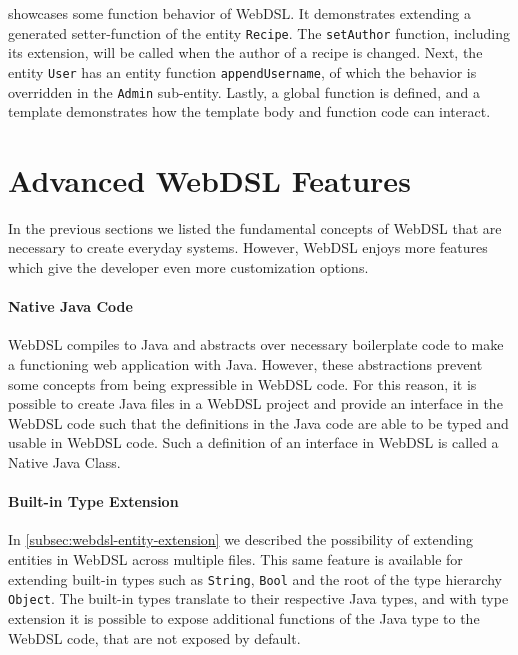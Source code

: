      showcases some function behavior of WebDSL. It demonstrates extending a generated setter-function of the entity \texttt{Recipe}. The \texttt{setAuthor} function, including its extension, will be called when the author of a recipe is changed. Next, the entity \texttt{User} has an entity function \texttt{appendUsername}, of which the behavior is overridden in the \texttt{Admin} sub-entity. Lastly, a global function is defined, and a template demonstrates how the template body and function code can interact.
  
  \section{\label{sec:advanced-webdsl-features}Advanced WebDSL Features}

    In the previous sections we listed the fundamental concepts of WebDSL that are necessary to create everyday systems. However, WebDSL enjoys more features which give the developer even more customization options.

    \paragraph{Native Java Code} WebDSL compiles to Java and abstracts over necessary boilerplate code to make a functioning web application with Java. However, these abstractions prevent some concepts from being expressible in WebDSL code. For this reason, it is possible to create Java files in a WebDSL project and provide an interface in the WebDSL code such that the definitions in the Java code are able to be typed and usable in WebDSL code. Such a definition of an interface in WebDSL is called a Native Java Class.

    \paragraph{Built-in Type Extension} In \cref{subsec:webdsl-entity-extension} we described the possibility of extending entities in WebDSL across multiple files. This same feature is available for extending built-in types such as \texttt{String}, \texttt{Bool} and the root of the type hierarchy \texttt{Object}. The built-in types translate to their respective Java types, and with type extension it is possible to expose additional functions of the Java type to the WebDSL code, that are not exposed by default.

